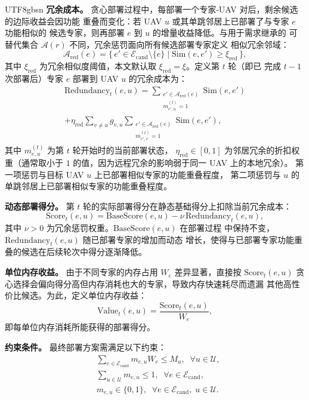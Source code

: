 \documentclass[conference]{IEEEtran}
\begin{document}
\begin{CJK*}{UTF8}{gbsn}
\textbf{冗余成本。}
贪心部署过程中，每部署一个专家-UAV 对后，剩余候选的边际收益会因功能
重叠而变化：若 UAV $u$ 或其单跳邻居上已部署了与专家 $e$ 功能相似的
候选专家，则再部署 $e$ 到 $u$ 的增量收益降低。与用于需求继承的
可替代集合 $\mathcal{A}(r)$ 不同，冗余惩罚面向所有候选部署专家定义
相似冗余邻域：
\begin{equation}
\mathcal{A}_{\mathrm{red}}(e)=
\{\,e'\in\mathcal{E}_{\mathrm{cand}}\setminus\{e\}
\mid \mathrm{Sim}(e,e')\ge \xi_{\mathrm{red}}\,\},
\label{eq:ared}
\end{equation}
其中 $\xi_{\mathrm{red}}$ 为冗余相似度阈值，本文默认取
$\xi_{\mathrm{red}}=\xi$。定义第 $t$ 轮（即已
完成 $t-1$ 次部署后）专家 $e$ 部署到 UAV $u$ 的冗余成本为：
\begin{multline}
\mathrm{Redundancy}_t(e,u) =
\sum_{\substack{e'\in\mathcal{A}_{\mathrm{red}}(e)\\[-2pt] m_{e',u}^{(t)}=1}}
  \mathrm{Sim}(e,e') \\
+ \eta_{\mathrm{red}} \sum_{v\neq u} g_{v,u}
  \sum_{\substack{e'\in\mathcal{A}_{\mathrm{red}}(e)\\[-2pt] m_{e',v}^{(t)}=1}}
  \mathrm{Sim}(e,e'),
\label{eq:redundancy}
\end{multline}
其中 $m_{e,u}^{(t)}$ 为第 $t$ 轮开始时的当前部署状态，
$\eta_{\mathrm{red}}\in[0,1]$ 为邻居冗余的折扣权重（通常取小于 $1$
的值，因为远程冗余的影响弱于同一 UAV 上的本地冗余）。
第一项惩罚与目标 UAV $u$ 上已部署相似专家的功能重叠程度，
第二项惩罚与 $u$ 的单跳邻居上已部署相似专家的功能重叠程度。

\textbf{动态部署得分。}
第 $t$ 轮的实际部署得分在静态基础得分上扣除当前冗余成本：
\begin{equation}
\mathrm{Score}_t(e,u) = \mathrm{BaseScore}(e,u) -
\nu\,\mathrm{Redundancy}_t(e,u),
\label{eq:score_t}
\end{equation}
其中 $\nu > 0$ 为冗余惩罚权重。$\mathrm{BaseScore}(e,u)$ 在部署过程
中保持不变，$\mathrm{Redundancy}_t(e,u)$ 随已部署专家的增加而动态
增长，使得与已部署专家功能重叠的候选在后续轮次中得分逐渐降低。

\textbf{单位内存收益。}
由于不同专家的内存占用 $W_e$ 差异显著，直接按 $\mathrm{Score}_t(e,u)$
贪心选择会偏向得分高但内存消耗也大的专家，导致内存快速耗尽而遗漏
其他高性价比候选。为此，定义单位内存收益：
\begin{equation}
\mathrm{Value}_t(e,u) = \frac{\mathrm{Score}_t(e,u)}{W_e},
\label{eq:value_t}
\end{equation}
即每单位内存消耗所能获得的部署得分。

\textbf{约束条件。}
最终部署方案需满足以下约束：
\begin{align}
&\sum_{e\in\mathcal{E}_{\mathrm{cand}}} m_{e,u} W_e \le M_u,
\;\; \forall u\in\mathcal{U},
\label{eq:memory_constraint}\\
&\sum_{u\in\mathcal{U}} m_{e,u} \le 1,
\;\; \forall e\in\mathcal{E}_{\mathrm{cand}},
\label{eq:single_copy}\\
&m_{e,u} \in \{0,1\},
\;\; \forall e\in\mathcal{E}_{\mathrm{cand}},\;u\in\mathcal{U}.
\label{eq:binary_m}
\end{align}


\end{CJK*}
\end{document}
